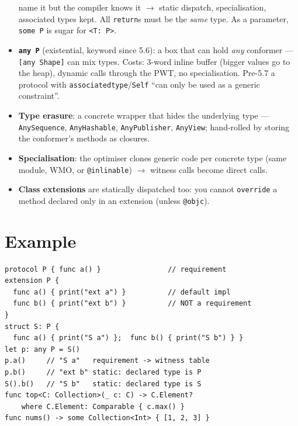 \documentclass[8pt]{extarticle}
\begin{document}
\begin{multicols}{2}
\begin{itemize}
        name it but the compiler knows it $\to$ static dispatch, specialisation, associated types
        kept. All \texttt{return}s must be the \emph{same} type. As a parameter, \texttt{some P}
        is sugar for \texttt{<T: P>}.
  \item \textbf{\texttt{any P}} (existential, keyword since 5.6): a box that can hold \emph{any}
        conformer — \texttt{[any Shape]} can mix types. Costs: 3-word inline buffer (bigger values go
        to the heap), dynamic calls through the PWT, no specialisation. Pre-5.7 a protocol with
        \texttt{associatedtype}/\texttt{Self} ``can only be used as a generic constraint''.
  \item \textbf{Type erasure}: a concrete wrapper that hides the underlying type —
        \texttt{AnySequence}, \texttt{AnyHashable}, \texttt{AnyPublisher}, \texttt{AnyView}; hand-rolled
        by storing the conformer's methods as closures.
  \item \textbf{Specialisation}: the optimiser clones generic code per concrete type (same module,
        WMO, or \texttt{@inlinable}) $\to$ witness calls become direct calls.
  \item \textbf{Class extensions} are statically dispatched too: you cannot \texttt{override} a
        method declared only in an extension (unless \texttt{@objc}).
\end{itemize}

\section{Example}
\begin{lstlisting}[language=SwiftSheet]
protocol P { func a() }                // requirement
extension P {
  func a() { print("ext a") }          // default impl
  func b() { print("ext b") }          // NOT a requirement
}
struct S: P {
  func a() { print("S a") };  func b() { print("S b") } }
let p: any P = S()
p.a()     // "S a"   requirement -> witness table
p.b()     // "ext b" static: declared type is P
S().b()   // "S b"   static: declared type is S
func top<C: Collection>(_ c: C) -> C.Element?
    where C.Element: Comparable { c.max() }
func nums() -> some Collection<Int> { [1, 2, 3] }
\end{lstlisting}

\columnbreak


\end{multicols}
\end{document}
